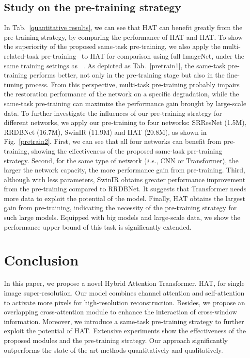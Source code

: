 \documentclass[10pt,twocolumn,letterpaper]{article}
\begin{document}
\subsection{Study on the pre-training strategy}
\label{cmp_pretrain}
In Tab.~\ref{quantitative results}, we can see that HAT can benefit greatly from the pre-training strategy, by comparing the performance of HAT and {HAT}. To show the superiority of the proposed same-task pre-training, we also apply the multi-related-task pre-training~\cite{edt} to HAT for comparison using full ImageNet, under the same training settings as ~\cite{edt}. As depicted as Tab.~\ref{pretrain1}, the same-task pre-training performs better, not only in the pre-training stage but also in the fine-tuning process. From this perspective, multi-task pre-training probably impairs the restoration performance of the network on a specific degradation, while the same-task pre-training can maximize the performance gain brought by large-scale data. To further investigate the influences of our pre-training strategy for different networks, we apply our pre-training to four networks: SRResNet (1.5M), RRDBNet (16.7M), SwinIR (11.9M) and HAT (20.8M), as shown in Fig.~\ref{pretrain2}. First, we can see that all four networks can benefit from pre-training, showing the effectiveness of the proposed same-task pre-training strategy. Second, for the same type of network (\textit{i.e.}, CNN or Transformer), the larger the network capacity, the more performance gain from pre-training. Third, although with less parameters, SwinIR obtains greater performance improvement from the pre-training compared to RRDBNet. It suggests that Transformer needs more data to exploit the potential of the model. Finally, HAT obtains the largest gain from pre-training, indicating the necessity of the pre-training strategy for such large models. Equipped with big models and large-scale data, we show the performance upper bound of this task is significantly extended.



\section{Conclusion}
In this paper, we propose a novel Hybrid Attention Transformer, HAT, for single image super-resolution. Our model combines channel attention and self-attention to activate more pixels for high-resolution reconstruction. Besides, we propose an overlapping cross-attention module to enhance the interaction of cross-window information. Moreover, we introduce a same-task pre-training strategy to further exploit the potential of HAT. Extensive experiments show the effectiveness of the proposed modules and the pre-training strategy. Our approach significantly outperforms the state-of-the-art methods quantitatively and qualitatively. 
\end{document}
